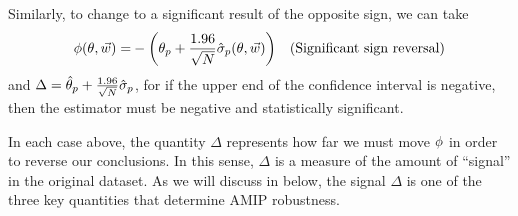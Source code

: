 Similarly,
to change to a significant result of the opposite sign, we can take
%
\begin{align*}
%
\thetafun(\theta, \w) =&
- \left(\theta_{\p} + \frac{1.96}{\sqrt{N}} \hat\sigma_{\p}(\theta, \w) \right)
& \textrm{(Significant sign reversal)}
%
\end{align*}
%
and $\Delta = \hat{\theta}_{p} + \frac{1.96}{\sqrt{N}} \hat\sigma_{p}$, for if
the upper end of the confidence interval is negative, then the estimator must be
negative and statistically significant.

In each case above, the quantity $\Delta$ represents how far we must move
$\phi$ in order to reverse our conclusions.  In this sense, $\Delta$ is a
measure of the amount of ``signal'' in the original dataset.  As we will discuss
in  below, the signal $\Delta$ is one of the three
key quantities that determine AMIP robustness.
